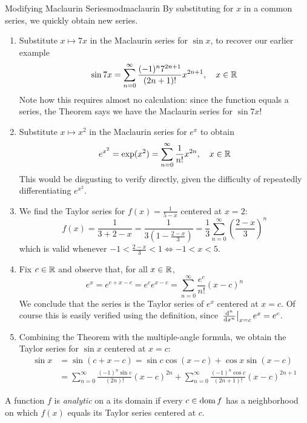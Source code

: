 \begin{examples}{Modifying Maclaurin Series}{modmaclaurin}
	By substituting for $x$ in a common series, we quickly obtain new series.
	\begin{enumerate}
	  \item Substitute $x\mapsto 7x$ in the Maclaurin series for $\sin x$, to recover our earlier example
	 	\[
	 		\sin 7x=\sum_{n=0}^\infty\frac{(-1)^n7^{2n+1}}{(2n+1)!}x^{2n+1},\quad x\in \R
	 	\]
		Note how this requires almost no calculation: since the function equals a series, the Theorem says we have the Maclaurin series for $\sin 7x$!
		
		\item Substitute $x\mapsto x^2$ in the Maclaurin series for $e^x$ to obtain
	  \[
	  	e^{x^2}=\exp(x^2)=\sum_{n=0}^\infty \frac{1}{n!}x^{2n},\quad x\in\R
	  \]
	  This would be disgusting to verify directly, given the difficulty of repeatedly differentiating $e^{x^2}$.
	  
	  \item We find the Taylor series for $f(x)=\frac 1{5-x}$ centered at $x=2$:
	  \[
	  	f(x)=\frac 1{3+2-x} =\frac 1{3(1-\frac{2-x}3)} =\frac 13\sum_{n=0}^\infty\left(\frac{2-x}3\right)^n
	  \]
	  which is valid whenever $-1<\frac{2-x}3<1\iff -1<x<5$.
	  
	  \item Fix $c\in\R$ and observe that, for all $x\in\R$,
	  \[
	  	e^x=e^{c+x-c}=e^ce^{x-c}=\sum_{n=0}^\infty \frac{e^c}{n!}(x-c)^n
	  \]
	  We conclude that the series is the Taylor series of $e^x$ centered at $x=c$. Of course this is easily verified using the definition, since $\diffat[^n]{x^n}{x=c}e^x=e^c$.
	  
	  \item Combining the Theorem with the multiple-angle formula, we obtain the Taylor series for $\sin x$ centered at $x=c$:
	  \begin{align*}
	  	\sin x&=\sin(c+x-c)
	  	=\sin c\cos(x-c)+\cos x\sin(x-c)\\
	  	&=\sum_{n=0}^\infty\frac{(-1)^n\sin c}{(2n)!}(x-c)^{2n} 
	  	+\sum_{n=0}^\infty\frac{(-1)^n\cos c}{(2n+1)!}(x-c)^{2n+1}
	  \end{align*}
	\end{enumerate}
\end{examples}


\begin{defn}{}{}
	A function $f$ is \emph{analytic} on a its domain if every $c\in\dom f$ has a neighborhood on which $f(x)$ equals its Taylor series centered at $c$.
\end{defn} 
	
